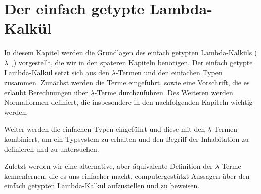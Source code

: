 \renewcommand{\implies}{\Rightarrow}
\renewcommand{\impliedby}{\Leftarrow}
\newcommand{\V}{\ensuremath{\mathcal{V}}}
\newcommand{\At}{\ensuremath{\mathbb{A}}}
\newcommand{\T}{\ensuremath{\mathbb{T}}}
\newcommand{\tI}{\textbf{I}}
\newcommand{\tK}{\textbf{K}}
\newcommand{\tS}{\textbf{S}}
\newcommand{\tLambda}{\texorpdfstring{\ensuremath{\Lambda}}{Lambda}}
\newcommand{\tlambda}{\texorpdfstring{\ensuremath{\lambda}}{lambda}}
\newcommand{\talpha}{\texorpdfstring{\ensuremath{\alpha}}{alpha}}
\newcommand{\tbeta}{\texorpdfstring{\ensuremath{\beta}}{beta}}
\newcommand{\teta}{\texorpdfstring{\ensuremath{\eta}}{eta}}
\newcommand{\zB}{z.\,B. } 
\newcommand{\betared}{\ensuremath{\rightarrow_\beta}}
\newcommand{\msbetared}{\ensuremath{\twoheadrightarrow_\beta}}
\newcommand{\etared}{\ensuremath{\rightarrow_\eta}}
\newcommand{\msetared}{\ensuremath{\twoheadrightarrow_\eta}}
\newcommand{\etaexp}{\ensuremath{\rightarrow_\eta^{-1}}}
\newcommand{\msetaexp}{\ensuremath{\twoheadrightarrow_\eta^{-1}}}
\newcommand{\nat}{\ensuremath{\mathbb{N}}}
\newcommand{\IPCarr}{\ensuremath{\text{IPC}_\to}}
\newcommand{\STLC}{\ensuremath{\lambda_\to}}
\newcommand{\Long}{\text{Long}}


\chapter{Der einfach getypte Lambda-Kalkül}
\label{ch:stlc}

In diesem Kapitel werden die Grundlagen des einfach getypten Lambda-Kalküls ($\STLC$) vorgestellt, die wir in den späteren Kapiteln benötigen.
Der einfach getypte Lambda-Kalkül setzt sich aus den \tlambda-Termen und den einfachen Typen zusammen. Zunächst werden die Terme eingeführt, sowie eine Vorschrift, die es erlaubt Berechnungen über \tlambda-Terme durchzuführen. Des Weiteren werden Normalformen definiert, die insbesondere in den nachfolgenden Kapiteln wichtig werden.
 
Weiter werden die einfachen Typen eingeführt und diese mit den \tlambda-Termen kombiniert, um ein Typsystem zu erhalten und den Begriff der Inhabitation zu definieren und zu untersuchen.

Zuletzt werden wir eine alternative, aber äquivalente Definition der \tlambda-Terme kennenlernen, die es uns einfacher macht, computergestützt Aussagen über den einfach getypten Lambda-Kalkül aufzustellen und zu beweisen.
